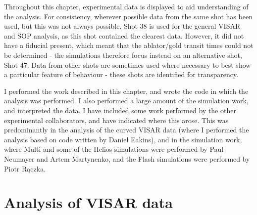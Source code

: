 Throughout this chapter, experimental data is displayed to aid understanding of the analysis. For consistency, wherever possible data from the same shot has been used, but this was not always possible. Shot 38 is used for the general VISAR and SOP analysis, as this shot contained the clearest data. However, it did not have a fiducial present, which meant that the ablator/gold transit times could not be determined - the simulations therefore focus instead on an alternative shot, Shot 47. Data from other shots are sometimes used where necessary to best show a particular feature of behaviour - these shots are identified for transparency.

I performed the work described in this chapter, and wrote the code in which the analysis was performed. I also performed a large amount of the simulation work, and interpreted the data. I have included some work performed by the other experimental collaborators, and have indicated where this arose. This was predominantly in the analysis of the curved VISAR data (where I performed the analysis based on code written by Daniel Eakins), and in the simulation work, where Multi and some of the Helios simulations were performed by Paul Neumayer and Artem Martynenko, and the Flash simulations were performed by Piotr R\k{a}czka.

\section{Analysis of VISAR data} \label{VISAR analysis}


